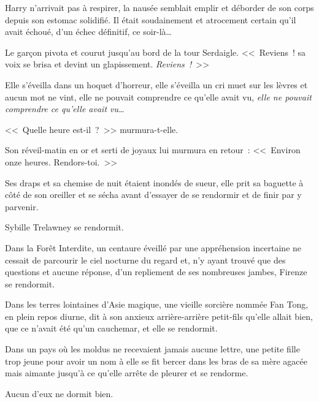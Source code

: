 Harry n'arrivait pas à respirer, la nausée semblait emplir et déborder de son corps depuis son estomac solidifié. Il était soudainement et atrocement certain qu'il avait échoué, d'un échec définitif, ce soir-là…

Le garçon pivota et courut jusqu'au bord de la tour Serdaigle. <<~Reviens~! sa voix se brisa et devint un glapissement. \emph{Reviens~!}~>>


Elle s'éveilla dans un hoquet d'horreur, elle s'éveilla un cri muet sur les lèvres et aucun mot ne vint, elle ne pouvait comprendre ce qu'elle avait vu, \emph{elle ne pouvait comprendre ce qu'elle avait vu…}

<<~Quelle heure est-il~?~>> murmura-t-elle.

Son réveil-matin en or et serti de joyaux lui murmura en retour~: <<~Environ onze heures. Rendors-toi.~>>

Ses draps et sa chemise de nuit étaient inondés de sueur, elle prit sa baguette à côté de son oreiller et se sécha avant d'essayer de se rendormir et de finir par y parvenir.

Sybille Trelawney se rendormit.

Dans la Forêt Interdite, un centaure éveillé par une appréhension incertaine ne cessait de parcourir le ciel nocturne du regard et, n'y ayant trouvé que des questions et aucune réponse, d'un repliement de ses nombreuses jambes, Firenze se rendormit.

Dans les terres lointaines d'Asie magique, une vieille sorcière nommée Fan Tong, en plein repos diurne, dit à son anxieux arrière-arrière petit-fils qu'elle allait bien, que ce n'avait été qu'un cauchemar, et elle se rendormit.

Dans un pays où les moldus ne recevaient jamais aucune lettre, une petite fille trop jeune pour avoir un nom à elle se fit bercer dans les bras de sa mère agacée mais aimante jusqu'à ce qu'elle arrête de pleurer et se rendorme.

Aucun d'eux ne dormit bien.
